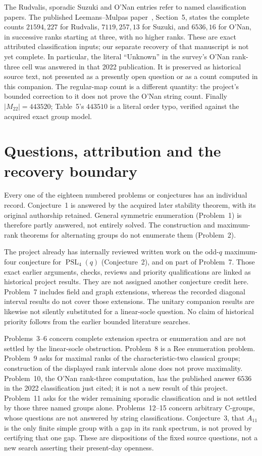 \documentclass[11pt]{article}
\newcommand{\PSL}{\operatorname{PSL}}\newcommand{\PGL}{\operatorname{PGL}}
\begin{document}
The Rudvalis, sporadic Suzuki and O'Nan entries refer to named
classification papers. The published Leemans--Mulpas paper~\cite{sporadic2022},
Section~5, states the complete counts $21594,227$ for Rudvalis,
$7119,257,13$ for Suzuki, and $6536,16$ for O'Nan, in successive ranks
starting at three, with no higher ranks. These are exact attributed
classification inputs; our separate recovery of that manuscript is not
yet complete. In particular, the literal ``Unknown'' in the survey's
O'Nan rank-three cell was answered in that 2022 publication. It is
preserved as historical source text, not presented as a presently open
question or as a count computed in this companion. The regular-map
count is a different quantity: the project's bounded correction to it
does not prove the O'Nan string count. Finally $|M_{22}|=443520$; Table~5's $443510$ is a
literal order typo, verified against the acquired exact group model.

\section{Questions, attribution and the recovery boundary}\label{questions}
Every one of the eighteen numbered problems or conjectures has an
individual record. Conjecture~1 is answered by the acquired later
stability theorem, with its original authorship retained. General
symmetric enumeration (Problem~1) is therefore partly answered, not
entirely solved. The construction and maximum-rank theorems for
alternating groups do not enumerate them (Problem~2).

The project already has internally reviewed written work on the
odd-$q$ maximum-four conjecture for $\PSL_4(q)$ (Conjecture~2), and
on part of Problem~7. Those exact earlier arguments, checks, reviews
and priority qualifications are linked as historical project results.
They are not assigned another conjecture credit here. Problem~7
includes field and graph extensions, whereas the recorded diagonal
interval results do not cover those extensions. The unitary companion
results are likewise not silently substituted for a linear-socle
question. No claim of historical priority follows from the earlier
bounded literature searches.

Problems~3--6 concern complete extension spectra or enumeration and
are not settled by the linear-socle obstruction. Problem~8 is a Ree
enumeration problem. Problem~9 asks for maximal ranks of the
characteristic-two classical groups; construction of the displayed
rank intervals alone does not prove maximality. Problem~10, the O'Nan rank-three computation, has the published answer
$6536$ in the 2022 classification just cited; it is not a new result of
this project. Problem~11 asks for the wider remaining sporadic classification
and is not settled by those three named groups alone. Problems~12--15 concern
arbitrary C-groups, whose questions are not answered by string
classifications. Conjecture~3, that $A_{11}$ is the only finite simple
group with a gap in its rank spectrum, is not proved by certifying
that one gap. These are dispositions of the fixed source questions,
not a new search asserting their present-day openness.
\end{document}
